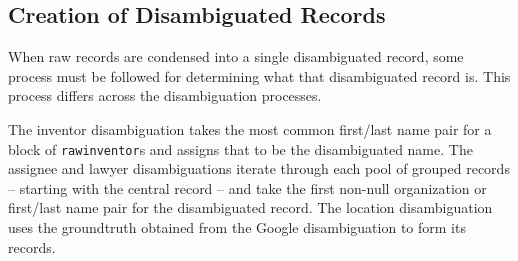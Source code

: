 \subsection{Creation of Disambiguated Records}

When raw records are condensed into a single disambiguated record, some process must
be followed for determining what that disambiguated record is. This process differs across
the disambiguation processes. 

The inventor disambiguation takes the most common first/last name pair for a block of
\verb`rawinventor`s and assigns that to be the disambiguated name. The assignee and
lawyer disambiguations iterate through each pool of grouped records -- starting with
the central record -- and take the first non-null organization or first/last name pair for
the disambiguated record. The location disambiguation uses the groundtruth obtained
from the Google disambiguation to form its records.